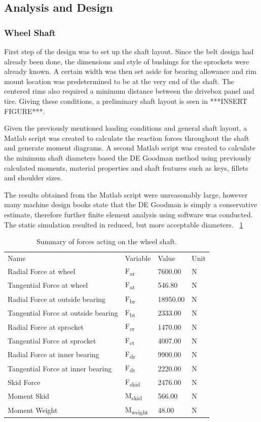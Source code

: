 \subsection{Analysis and Design}
\subsubsection{Wheel Shaft}
First step of the design was to set up the shaft layout. Since the belt design had already been done, the dimensions and style of bushings for the sprockets were already known. A certain width was then set aside for bearing allowance and rim mount location was predetermined to be at the very end of the shaft. The centered rims also required a minimum distance between the drivebox panel and tire. Giving these conditions, a preliminary shaft layout is seen in ***INSERT FIGURE***.

Given the previously mentioned loading conditions and general shaft layout, a Matlab script was created to calculate the reaction forces throughout the shaft and generate moment diagrams. A second Matlab script was created to calculate the minimum shaft diameters based the DE Goodman method using previously calculated moments, material properties and shaft features such as keys, fillets and shoulder sizes.

The results obtained from the Matlab script were unreasonably large, however many machine design books state that the DE Goodman is simply a conservative estimate, therefore further finite element analysis using software was conducted. The static simulation resulted in reduced, but more acceptable diameters. 
~\ref {tab:shaft_calc}

\begin{table}[htbp]
	\centering
	\caption{Summary of forces acting on the wheel shaft.}
	\begin{tabular}{| llll |} \hline
		Name & Variable & Value & Unit \\
		Radial Force at wheel & F\textsubscript{ar} & 7600.00 & N \\
		Tangential Force at wheel & F\textsubscript{at} & 546.80 & N \\
		Radial Force at outside bearing & F\textsubscript{br} & 18950.00 & N \\
		Tangential Force at outside bearing & F\textsubscript{bt} & 2333.00 & N \\
		Radial Force at sprocket & F\textsubscript{cr} & 1470.00 & N \\
		Tangential Force at sprocket & F\textsubscript{ct} & 4007.00 & N \\
		Radial Force at inner bearing & F\textsubscript{dr} & 9900.00 & N \\
		Tangential Force at inner bearing & F\textsubscript{dt} & 2220.00 & N \\
		Skid Force & F\textsubscript{skid} & 2476.00 & N \\
		Moment Skid & M\textsubscript{skid} & 566.00 & N \\
		Moment Weight & M\textsubscript{weight} & 48.00 & N \\ \hline
	\end{tabular}
	\label{tab:shaft_calc}
\end{table}

